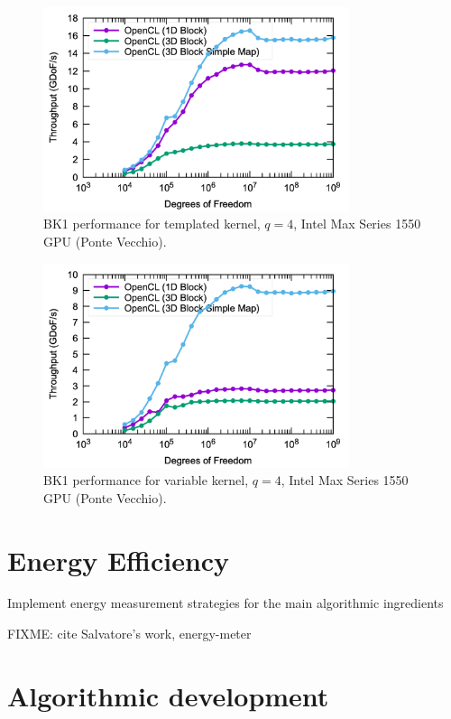 \documentclass[a4paper,12pt]{article}
\begin{document}
\begin{figure}[htbp]
  \centering
  \includegraphics[width=0.8\textwidth]{pvc_opencl_q4_static} %
  \caption{BK1 performance for templated kernel, $q = 4$, Intel Max Series 1550 GPU (Ponte Vecchio).}
  \label{fig:pvc_static}
\end{figure}

\begin{figure}[htbp]
  \centering
  \includegraphics[width=0.8\textwidth]{pvc_opencl_q4_dynamic} %
  \caption{BK1 performance for variable kernel, $q = 4$, Intel Max Series 1550 GPU (Ponte Vecchio).}
  \label{fig:pvc_dynamic}
\end{figure}


\section{Energy Efficiency}

Implement energy measurement strategies for the main algorithmic ingredients

FIXME: cite Salvatore's work, energy-meter 

\section{Algorithmic development}
\end{document}
